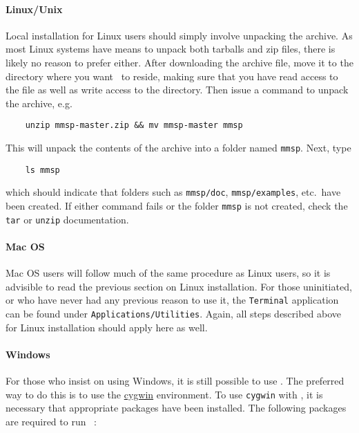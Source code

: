 \paragraph{Linux/Unix}
Local installation for Linux users should simply involve unpacking the archive.  As most Linux systems have means to unpack both tarballs and zip files, there is likely no reason to prefer either.  After downloading the archive file, move it to the directory where you want \MMSP\ to reside, making sure that you have read access to the file as well as write access to the directory.  Then issue a command to unpack the archive, e.g.
\begin{shadebox}
\begin{verbatim}
    unzip mmsp-master.zip && mv mmsp-master mmsp
\end{verbatim}
\end{shadebox}
This will unpack the contents of the archive into a folder named {\tt mmsp}.  Next, type
\begin{shadebox}
\begin{verbatim}
    ls mmsp
\end{verbatim}
\end{shadebox}
which should indicate that folders such as {\tt mmsp/doc}, {\tt mmsp/examples}, etc.~have been created.  If either command fails or the folder {\tt mmsp} is not created, check the {\tt tar} or {\tt unzip} documentation.

\paragraph{Mac OS}
Mac OS users will follow much of the same procedure as Linux users, so it is advisible to read the previous section on Linux installation.  For those uninitiated, or who have never had any previous reason to use it, the {\tt Terminal} application can be found under {\tt Applications/Utilities}.  Again, all steps described above for Linux installation should apply here as well.

\paragraph{Windows}
For those who insist on using Windows, it is still possible to use \MMSP.  The preferred way to do this is to use the \href{http://www.cygwin.com}{cygwin} environment.  To use {\tt cygwin} with \MMSP, it is necessary that appropriate packages have been installed.  The following packages are required to run \MMSP\ : 

